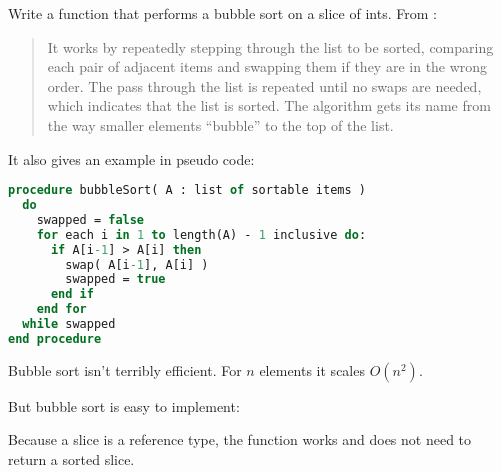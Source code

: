 \begin{Exercise}[title={Bubble sort},difficulty=1]
\label{ex:bubble}
\Question\label{ex:bubble q1} Write a function that performs 
a bubble sort on a slice of ints. From \cite{bubblesort}:
\begin{quote}
It works by repeatedly stepping through the list to be sorted, comparing each
pair of adjacent items and swapping them if they are in the wrong order. The
pass through the list is repeated until no swaps are needed, which indicates
that the list is sorted. The algorithm gets its name from the way smaller
elements ``bubble'' to the top of the list. 
\end{quote}

It also gives an example in pseudo code:
\begin{lstlisting}[language=pascal]
procedure bubbleSort( A : list of sortable items )
  do
    swapped = false
    for each i in 1 to length(A) - 1 inclusive do:
      if A[i-1] > A[i] then
        swap( A[i-1], A[i] )
        swapped = true
      end if
    end for
  while swapped
end procedure
\end{lstlisting}
\end{Exercise}

\begin{Answer}
\Question 
Bubble sort isn't terribly efficient. For $n$ elements it scales
$O(n^2)$.

But bubble sort is easy to implement:


Because a slice is a reference type, the  function works and
does not need to return a sorted slice.
\end{Answer}
